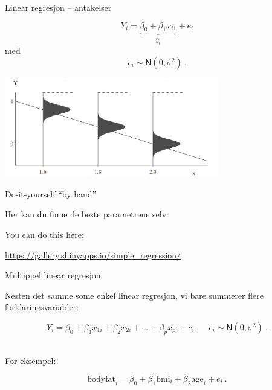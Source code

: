 \documentclass[10pt,ignorenonframetext,]{beamer}
\begin{document}
\begin{frame}{Linear regresjon -- antakelser}
\protect\hypertarget{linear-regresjon-antakelser}{}

\[Y_i = \underbrace{\beta_0 + \beta_1 x_{i1}}_{\hat{y}_i} + e_i\] med
\[e_i \sim \textsf{N}(0,\sigma^2) \ .\]

\centering

\includegraphics[width=0.7\textwidth,height=\textheight]{regrAssumptions.jpg}

\end{frame}

\begin{frame}

\begin{block}{Do-it-yourself ``by hand''}

\vspace{6mm}

Her kan du finne de beste parametrene selv: \vspace{2mm}

You can do this here: \vspace{2mm}

\url{https://gallery.shinyapps.io/simple_regression/}

\end{block}

\end{frame}

\begin{frame}{Multippel linear regresjon}
\protect\hypertarget{multippel-linear-regresjon}{}

Nesten det samme some enkel linear regresjon, vi bare summerer flere
forklaringsvariabler:

\[Y_i = \beta_0 + \beta_1 x_{1i} + \beta_2 x_{2i} + \ldots + \beta_p x_{pi} + e_i \ , \quad e_i \sim\mathsf{N}(0,\sigma^2) \ .\]
\(~\)

For eksempel:

\[\text{bodyfat}_i = \beta_0 + \beta_1 \text{bmi}_i + \beta_2 \text{age}_i + e_i \ .\]

\end{frame}
\end{document}
